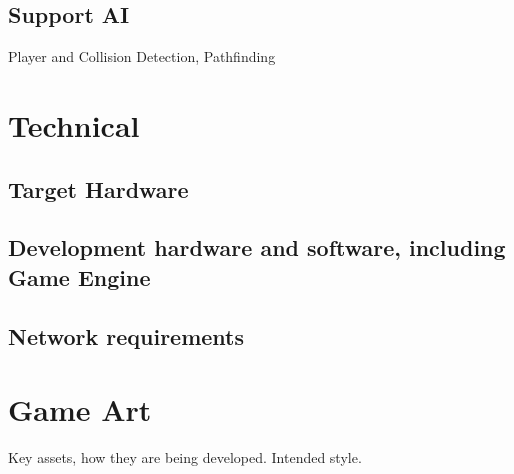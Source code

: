 \documentclass[12pt, letterpaper]{article}
\begin{document}
    \subsection{Support AI}
    Player and Collision Detection, Pathfinding
\section{Technical }
    \subsection{Target Hardware}
    \subsection{Development hardware and software, including Game Engine}
    \subsection{Network requirements}
\section{Game Art}
Key assets, how they are being developed.  Intended style.
\end{document}
